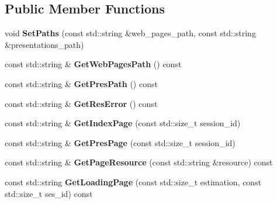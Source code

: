 \subsection*{Public Member Functions}
\begin{DoxyCompactItemize}
\item 
\hypertarget{classhttp__server_1_1cPageBuilder_a74c2228037c0896353b0a53882c05270}{void {\bfseries Set\-Paths} (const std\-::string \&web\-\_\-pages\-\_\-path, const std\-::string \&presentations\-\_\-path)}\label{classhttp__server_1_1cPageBuilder_a74c2228037c0896353b0a53882c05270}

\item 
\hypertarget{classhttp__server_1_1cPageBuilder_a1ed3765f2b8a1bda49083e9c2ab27d4d}{const std\-::string \& {\bfseries Get\-Web\-Pages\-Path} () const }\label{classhttp__server_1_1cPageBuilder_a1ed3765f2b8a1bda49083e9c2ab27d4d}

\item 
\hypertarget{classhttp__server_1_1cPageBuilder_ac3b731d2df941d71162be6f408478492}{const std\-::string \& {\bfseries Get\-Pres\-Path} () const }\label{classhttp__server_1_1cPageBuilder_ac3b731d2df941d71162be6f408478492}

\item 
\hypertarget{classhttp__server_1_1cPageBuilder_a694375755d3e0b8edb360a4f05d8c7aa}{const std\-::string \& {\bfseries Get\-Res\-Error} () const }\label{classhttp__server_1_1cPageBuilder_a694375755d3e0b8edb360a4f05d8c7aa}

\item 
\hypertarget{classhttp__server_1_1cPageBuilder_a045ba157650645c9b2790389618f98d3}{const std\-::string \& {\bfseries Get\-Index\-Page} (const std\-::size\-\_\-t session\-\_\-id)}\label{classhttp__server_1_1cPageBuilder_a045ba157650645c9b2790389618f98d3}

\item 
\hypertarget{classhttp__server_1_1cPageBuilder_abf96471571f0b2783b2f18e77727a839}{const std\-::string \& {\bfseries Get\-Pres\-Page} (const std\-::size\-\_\-t session\-\_\-id)}\label{classhttp__server_1_1cPageBuilder_abf96471571f0b2783b2f18e77727a839}

\item 
\hypertarget{classhttp__server_1_1cPageBuilder_ac7a52ef639767e3f9297376cced2a8ab}{const std\-::string \& {\bfseries Get\-Page\-Resource} (const std\-::string \&resource) const }\label{classhttp__server_1_1cPageBuilder_ac7a52ef639767e3f9297376cced2a8ab}

\item 
\hypertarget{classhttp__server_1_1cPageBuilder_a510f14c10b161fa8b38d5ec52c7340e4}{const std\-::string {\bfseries Get\-Loading\-Page} (const std\-::size\-\_\-t estimation, const std\-::size\-\_\-t ses\-\_\-id) const }\label{classhttp__server_1_1cPageBuilder_a510f14c10b161fa8b38d5ec52c7340e4}


\end{DoxyCompactItemize}
